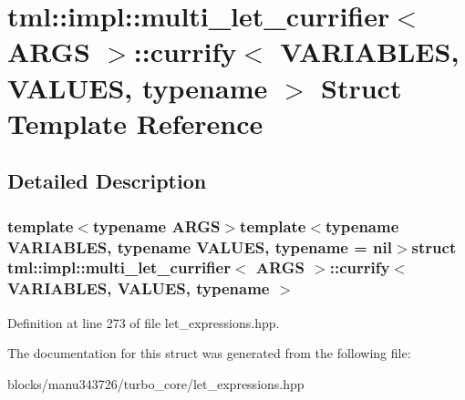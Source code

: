 \hypertarget{structtml_1_1impl_1_1multi__let__currifier_1_1currify}{\section{tml\+:\+:impl\+:\+:multi\+\_\+let\+\_\+currifier$<$ A\+R\+G\+S $>$\+:\+:currify$<$ V\+A\+R\+I\+A\+B\+L\+E\+S, V\+A\+L\+U\+E\+S, typename $>$ Struct Template Reference}
\label{structtml_1_1impl_1_1multi__let__currifier_1_1currify}
}


\subsection{Detailed Description}
\subsubsection*{template$<$typename A\+R\+G\+S$>$template$<$typename V\+A\+R\+I\+A\+B\+L\+E\+S, typename V\+A\+L\+U\+E\+S, typename = nil$>$struct tml\+::impl\+::multi\+\_\+let\+\_\+currifier$<$ A\+R\+G\+S $>$\+::currify$<$ V\+A\+R\+I\+A\+B\+L\+E\+S, V\+A\+L\+U\+E\+S, typename $>$}



Definition at line 273 of file let\+\_\+expressions.\+hpp.



The documentation for this struct was generated from the following file\+:\begin{DoxyCompactItemize}
\item 
blocks/manu343726/turbo\+\_\+core/let\+\_\+expressions.\+hpp\end{DoxyCompactItemize}
